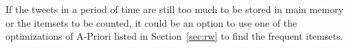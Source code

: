 If the tweets in a period of time are still too much to be stored in 
main memory or the itemsets to be counted, 
it could be an option to use one of the optimizations of A-Priori listed 
in Section~\ref{sec:rw} to find the frequent itemsets.





